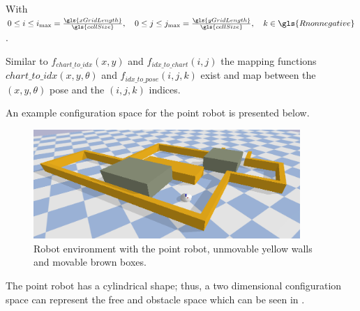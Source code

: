 With $0 \leq i \leq i_{\textrm{max}} = \frac{\gls{xGridLength}}{\gls{cellSize}}, \quad 0 \leq j \leq j_{\textrm{max}} = \frac{\gls{yGridLength}}{\gls{cellSize}}, \quad k \in \gls{Rnonnegative}$.\bs

Similar to $f_\mathit{chart\_to\_idx}(x, y)$ and $f_\mathit{idx\_to\_chart}(i,j)$ the mapping functions $\mathit{chart\_to\_idx}(x, y, \theta)$ and $f_\mathit{idx\_to\_pose}(i, j, k)$ exist and map between the $(x, y, \theta)$ pose and the $(i, j, k)$ indices.\bs

An example configuration space for the point robot is presented below.
\begin{figure}[H]
    \centering
    \includegraphics[width=0.9\textwidth]{figures/required_background/planning/two_push_to_freedom_env}
    \caption{Robot environment with the point robot, unmovable yellow walls and movable brown boxes.}%
    \label{fig:two_pushes_to_freedom_env}
\end{figure}

The point robot has a cylindrical shape; thus, a two dimensional configuration space can represent the free and obstacle space which can be seen in .


